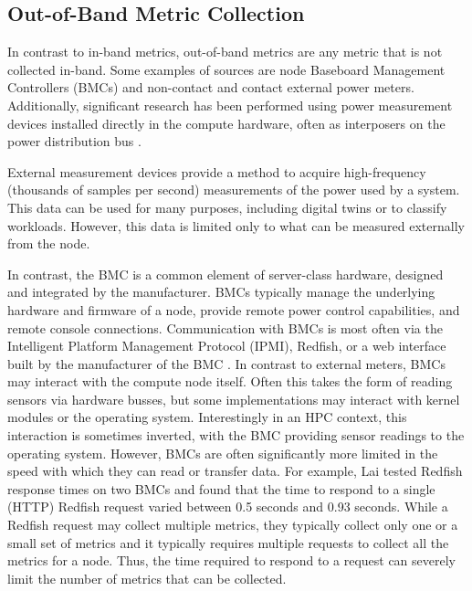 \documentclass[conference]{IEEEtran}
\begin{document}
\subsection{Out-of-Band Metric Collection}

In contrast to in-band metrics, out-of-band metrics are any metric that is not 
collected in-band. Some examples of sources are node 
Baseboard Management Controllers (BMCs)
\cite{liMonSTerOutoftheBoxMonitoring2020,cockEnzianOpenGeneral2022a} and 
non-contact\cite{kamilPowerEfficiencyHigh2008} and 
contact\cite{asgherEvaluatingHardwareSoftware2025,ilschePowerMeasurementTechniques2019} external power 
meters. Additionally, significant research has been performed using power 
measurement devices installed directly in the compute hardware, often as interposers on the power distribution bus \cite{ilschePowerMeasurementsCompute2015,larosPowerInsightCommodityPower2013,vlugtPowerSensor3FastAccurate2025}.

External measurement devices provide a method to acquire 
high-frequency (thousands of samples per second)\cite{ilschePowerMeasurementsCompute2015} measurements of the power used by a system. This data can be 
used for many purposes, including 
digital twins\cite{brewerDigitalTwinFramework2024}
 or to classify workloads\cite{kohlerRecognizingHPCWorkloads2021}.
However, this data is limited only to what can be measured externally from the 
node. 

In contrast, the BMC is a common element of server-class hardware, designed and 
integrated by the manufacturer.
BMCs typically manage the underlying hardware and firmware of a node, provide remote power 
control capabilities, and remote console connections. Communication with BMCs 
is most often via the Intelligent Platform Management Protocol 
(IPMI)\cite{IPMIStandard}, Redfish\cite{RedfishSpecification}, 
or a web interface built by the manufacturer of the BMC
\cite{enterpriseLoggingILOWeb,PowerEdgeSetIDRAC10,HPEAgentlessManagement}.
In contrast to external meters, BMCs may interact with the compute node itself. 
Often this takes the form of reading sensors via hardware busses, but some implementations may 
interact with kernel modules or the operating system\cite{IDRACServiceModule}. 
Interestingly in an HPC context, this interaction is sometimes inverted, with 
the BMC providing sensor readings to the operating system\cite{enterpriseUserAccessCompute,martinCrayXC30Power}.
However, BMCs are often significantly more limited in the speed with which they 
can read or transfer data. For example, Lai\cite{laiBenchmarkingBMCs} tested Redfish 
response times on two BMCs and found that the time to respond to a single 
(HTTP) Redfish request varied between 0.5 seconds and 0.93 seconds. While a 
Redfish request may collect multiple metrics, they typically collect only one or 
a small set of metrics and it typically requires multiple 
requests to collect all the metrics for a node. Thus, the time required to respond to a 
request can severely limit the number of metrics that can be collected.
\end{document}
